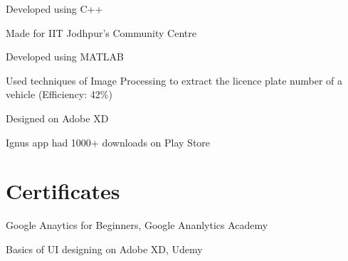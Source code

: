 \documentclass[]{deedy-resume-openfont}
\begin{document}
\begin{minipage}[t]{0.66\textwidth}
\vspace{\topsep} %
\begin{tightemize} 
\item Developed using C++
\item Made for IIT Jodhpur's Community Centre
\end{tightemize}
\sectionsep

\begin{tightemize} 
\item Developed using MATLAB
\item Used techniques of Image Processing to extract the licence plate number of a vehicle (Efficiency: 42\%)
\end{tightemize}
\sectionsep



\begin{tightemize} 
\item Designed on Adobe XD
\item Ignus app had 1000+ downloads on Play Store
\end{tightemize}
\sectionsep


\section{Certificates} 
\vspace{\topsep} %
\begin{tightemize} 
\item Google Anaytics for Beginners, Google Ananlytics Academy
\item Basics of UI designing on Adobe XD, Udemy
\end{tightemize}
\sectionsep


\end{minipage}
\end{document}
